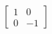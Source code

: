\documentclass[preview]{standalone}
\begin{document}
\begin{align*}
\begin{bmatrix} 1 & 0 \\ 0 & -1 \end{bmatrix}
\end{align*}
\end{document}
